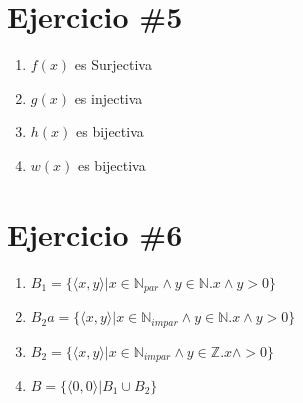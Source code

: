 \documentclass[10pt,letterpaper]{article}
\begin{document}
\section{Ejercicio \#5}
\begin{enumerate}
        \item{$f(x)$ es Surjectiva}
        \item{$g(x)$ es injectiva}
        \item{$h(x)$ es bijectiva}
        \item{$w(x)$ es bijectiva}
\end{enumerate}

\section{Ejercicio \#6}
\begin{enumerate}
        \item{$B_1=\{\langle x,y \rangle|x\in \mathbb{N}_{par} \wedge y\in \mathbb{N}. x \wedge y > 0 \}$}
        \item{$B_2a=\{\langle x,y \rangle|x\in \mathbb{N}_{impar} \wedge y\in \mathbb{N}. x \wedge y > 0 \}$}
        \item{$B_2=\{\langle x,y \rangle|x\in \mathbb{N}_{impar} \wedge y\in \mathbb{Z}. x \wedge > 0 \}$}
        \item{$B=\{\langle 0,0 \rangle|B_1 \cup B_2 \}$}
        

\end{enumerate}
\end{document}
